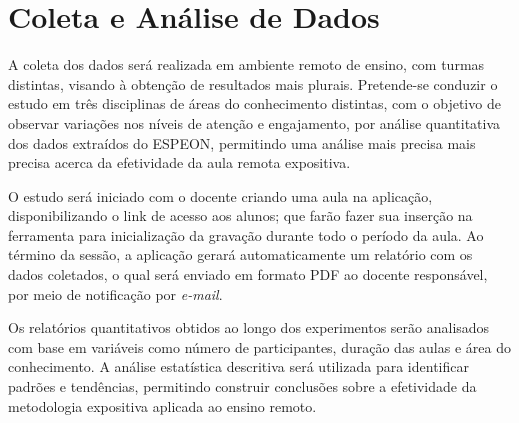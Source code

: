 \section{Coleta e Análise de Dados}\label{sec:datacollection}
A coleta dos dados será realizada em ambiente remoto de ensino, com turmas distintas, visando à obtenção de resultados mais plurais. Pretende-se conduzir o estudo em três disciplinas de áreas do conhecimento distintas, com o objetivo de observar variações nos níveis de atenção e engajamento, por análise quantitativa dos dados extraídos do ESPEON, permitindo uma análise mais precisa mais precisa acerca da efetividade da aula remota expositiva.

O estudo será iniciado com o docente criando uma aula na aplicação, disponibilizando o link de acesso aos alunos; que farão fazer sua inserção na ferramenta para inicialização da gravação durante todo o período da aula. Ao término da sessão, a aplicação gerará automaticamente um relatório com os dados coletados, o qual será enviado em formato PDF ao docente responsável, por meio de notificação por \textit{e-mail}.

Os relatórios quantitativos obtidos ao longo dos experimentos serão analisados com base em variáveis como número de participantes, duração das aulas e área do conhecimento. A análise estatística descritiva será utilizada para identificar padrões e tendências, permitindo construir conclusões sobre a efetividade da metodologia expositiva aplicada ao ensino remoto.